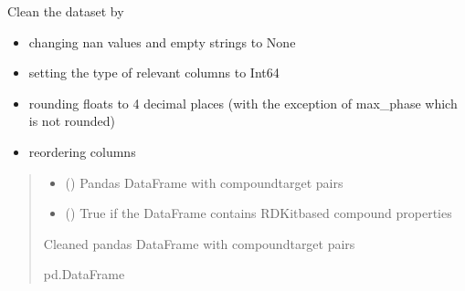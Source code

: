 \documentclass[letterpaper,10pt,english]{sphinxmanual}
\begin{document}
\begin{fulllineitems}
\label{\detokenize{clean_dataset:clean_dataset.clean_dataset}}
\pysigstartsignatures
{}
\pysigstopsignatures
\sphinxAtStartPar
Clean the dataset by
\begin{itemize}
\item {} 
\sphinxAtStartPar
changing nan values and empty strings to None

\item {} 
\sphinxAtStartPar
setting the type of relevant columns to Int64

\item {} 
\sphinxAtStartPar
rounding floats to 4 decimal places (with the exception of max\_phase which is not rounded)

\item {} 
\sphinxAtStartPar
reordering columns

\end{itemize}
\begin{quote}\begin{description}
\begin{itemize}
\item {} 
\sphinxAtStartPar
{} () \textendash{} Pandas DataFrame with compound\sphinxhyphen{}target pairs

\item {} 
\sphinxAtStartPar
{} () \textendash{} True if the DataFrame contains RDKit\sphinxhyphen{}based compound properties

\end{itemize}

\sphinxAtStartPar
Cleaned pandas DataFrame with compound\sphinxhyphen{}target pairs

\sphinxAtStartPar
pd.DataFrame

\end{description}\end{quote}

\end{fulllineitems}
\end{document}
